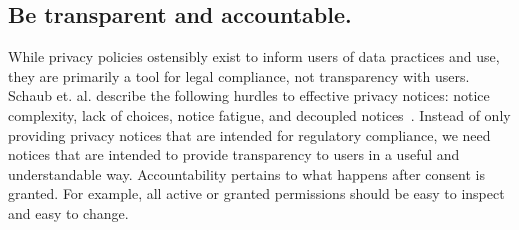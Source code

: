 \subsection{Be transparent and accountable.}
While privacy policies ostensibly exist to inform users of data practices and use, they are primarily a tool for legal compliance, not transparency with users. Schaub et. al. describe the following hurdles to effective privacy notices: notice complexity, lack of choices, notice fatigue, and decoupled notices~\cite{schaub}. Instead of only providing privacy notices that are intended for regulatory compliance, we need notices that are intended to provide transparency to users in a useful and understandable way. Accountability pertains to what happens after consent is granted. For example, all active or granted permissions should be easy to inspect and easy to change.
